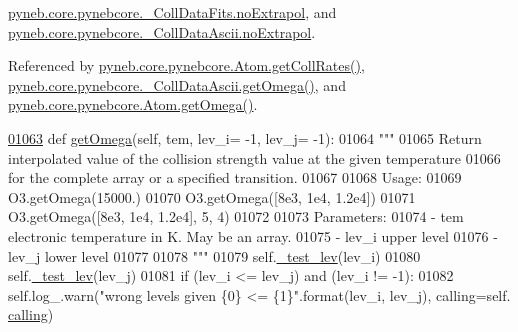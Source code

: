 \hyperlink{pynebcore_8py_source_l00567}{pyneb.\+core.\+pynebcore.\+\_\+\+Coll\+Data\+Fits.\+no\+Extrapol}, and \hyperlink{pynebcore_8py_source_l00917}{pyneb.\+core.\+pynebcore.\+\_\+\+Coll\+Data\+Ascii.\+no\+Extrapol}.



Referenced by \hyperlink{pynebcore_8py_source_l01329}{pyneb.\+core.\+pynebcore.\+Atom.\+get\+Coll\+Rates()}, \hyperlink{pynebcore_8py_source_l01063}{pyneb.\+core.\+pynebcore.\+\_\+\+Coll\+Data\+Ascii.\+get\+Omega()}, and \hyperlink{pynebcore_8py_source_l01262}{pyneb.\+core.\+pynebcore.\+Atom.\+get\+Omega()}.


\begin{DoxyCode}
\hypertarget{classpyneb_1_1core_1_1pynebcore_1_1___coll_data_ascii_l01063}{}\hyperlink{classpyneb_1_1core_1_1pynebcore_1_1___coll_data_ascii_a2f99c08a0f6a46d88b6e09b0a36495c2}{01063}     \textcolor{keyword}{def }\hyperlink{classpyneb_1_1core_1_1pynebcore_1_1___coll_data_ascii_a2f99c08a0f6a46d88b6e09b0a36495c2}{getOmega}(self, tem, lev\_i= -1, lev\_j= -1):
01064         \textcolor{stringliteral}{"""}
01065 \textcolor{stringliteral}{        Return interpolated value of the collision strength value at the given temperature }
01066 \textcolor{stringliteral}{            for the complete array or a specified transition.}
01067 \textcolor{stringliteral}{}
01068 \textcolor{stringliteral}{        Usage:}
01069 \textcolor{stringliteral}{            O3.getOmega(15000.)}
01070 \textcolor{stringliteral}{            O3.getOmega([8e3, 1e4, 1.2e4])}
01071 \textcolor{stringliteral}{            O3.getOmega([8e3, 1e4, 1.2e4], 5, 4)}
01072 \textcolor{stringliteral}{        }
01073 \textcolor{stringliteral}{        Parameters:}
01074 \textcolor{stringliteral}{            - tem    electronic temperature in K. May be an array.}
01075 \textcolor{stringliteral}{            - lev\_i  upper level}
01076 \textcolor{stringliteral}{            - lev\_j  lower level}
01077 \textcolor{stringliteral}{}
01078 \textcolor{stringliteral}{        """}
01079         self.\hyperlink{classpyneb_1_1core_1_1pynebcore_1_1___coll_data_ascii_a932859ccd799e220c26e9f9db0cdd0a6}{\_test\_lev}(lev\_i)
01080         self.\hyperlink{classpyneb_1_1core_1_1pynebcore_1_1___coll_data_ascii_a932859ccd799e220c26e9f9db0cdd0a6}{\_test\_lev}(lev\_j)
01081         \textcolor{keywordflow}{if} (lev\_i <= lev\_j) \textcolor{keywordflow}{and} (lev\_i != -1):
01082             self.log\_.warn(\textcolor{stringliteral}{"wrong levels given \{0\} <= \{1\}"}.format(lev\_i, lev\_j), calling=self.
      \hyperlink{classpyneb_1_1core_1_1pynebcore_1_1___coll_data_ascii_a08efc5898f4e03a1b7702d85f909e188}{calling})

\end{DoxyCode}
